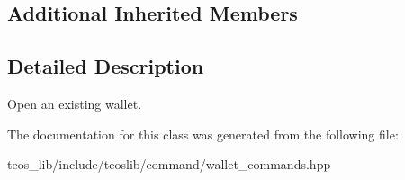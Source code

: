 \subsection*{Additional Inherited Members}


\subsection{Detailed Description}
Open an existing wallet. 

The documentation for this class was generated from the following file\+:\begin{DoxyCompactItemize}
\item 
teos\+\_\+lib/include/teoslib/command/wallet\+\_\+commands.\+hpp\end{DoxyCompactItemize}

